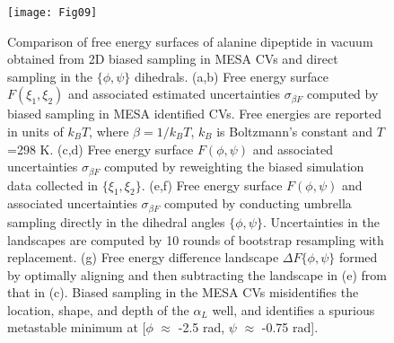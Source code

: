 \documentclass[12pt]{article}
\begin{document}
\begin{figure}[ht!]
\begin{center}
\texttt{[image: Fig09]} 
\end{center}
\end{figure}

\clearpage
\newpage

\begin{figure}[ht!]
\caption{Comparison of free energy surfaces of alanine dipeptide in vacuum obtained from 2D biased sampling in MESA CVs and direct sampling in the $\{\phi,\psi\}$ dihedrals. (a,b) Free energy surface $F(\xi_1,\xi_2)$ and associated estimated uncertainties $\sigma_{\beta F}$ computed by biased sampling in MESA identified CVs. Free energies are reported in units of $k_B T$, where $\beta = 1/k_B T$, $k_B$ is Boltzmann's constant and $T$=298 K. (c,d) Free energy surface $F(\phi,\psi)$ and associated uncertainties $\sigma_{\beta F}$ computed by reweighting the biased simulation data collected in $\{\xi_1,\xi_2\}$. (e,f) Free energy surface $F(\phi,\psi)$ and associated uncertainties $\sigma_{\beta F}$ computed by conducting umbrella sampling directly in the dihedral angles $\{\phi,\psi\}$. Uncertainties in the landscapes are computed by 10 rounds of bootstrap resampling with replacement. (g) Free energy difference landscape $\Delta F\{\phi,\psi\}$ formed by optimally aligning and then subtracting the landscape in (e) from that in (c). Biased sampling in the MESA CVs misidentifies the location, shape, and depth of the $\alpha_L$ well, and identifies a spurious metastable minimum at [$\phi$ $\approx$ -2.5 rad, $\psi$ $\approx$ -0.75 rad].}
\label{2D_FES}
\end{figure}
\end{document}
